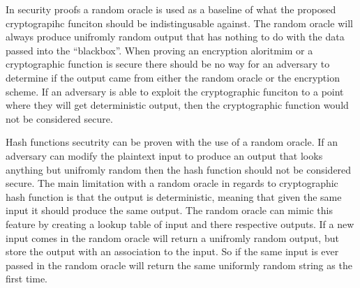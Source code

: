 \documentclass[letterpaper,11pt,notitlepage,fleqn]{article}
\begin{document}
In security proofs a random oracle is used as a baseline of what the proposed cryptograpihc funciton should be indistingusable against. The random oracle will always produce unifromly random output that has nothing to do with the data passed into the ``blackbox''. When proving an encryption aloritmim or a cryptographic function is secure there should be no way for an adversary to determine if the output came from either the random oracle or the encryption scheme. If an adversary is able
to exploit the cryptographic funciton to a point where they will get deterministic output, then the cryptographic function would not be considered secure. \

Hash functions secutrity can be proven with the use of a random oracle. If an adversary can modify the plaintext input to produce an output that looks anything but unifromly random then the hash function should not be considered secure. The main limitation with a random oracle in regards to cryptographic hash function is that the output is deterministic, meaning that given the same input it should produce the same output. The random oracle can mimic this feature by creating a lookup
table of input and there respective outputs. If a new input comes in the random oracle will return a unifromly random output, but store the output with an association to the input. So if the same input is ever passed in the random oracle will return the same uniformly random string as the first time. 

\medskip


\end{document}
